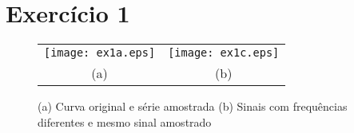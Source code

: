 \section*{Exercício 1}

    \begin{figure}[H]
        \centering
        \begin{tabular}{cc}
        \texttt{[image: ex1a.eps]} & \texttt{[image: ex1c.eps]} \\ (a) & (b)
        \end{tabular}
        \caption{\label{fig:ex1ac} (a) Curva original e série amostrada (b) Sinais com frequências diferentes e mesmo sinal amostrado} 
    \end{figure}
    
